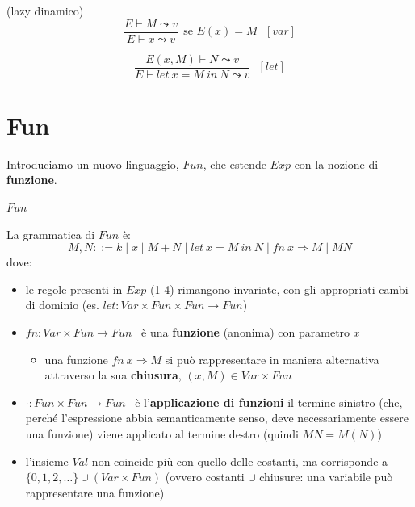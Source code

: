 \documentclass[a4paper,11pt]{report}
\begin{document}
\begin{gframe}[colframe=BlueGray, colback=BlueGrayLight, colbacktitle=BlueGray]{(lazy dinamico)}
    \vspace{-2em}
    \[ \frac{E\vdash M \leadsto v}{E\vdash x \leadsto v} \ \ \text{se } E(x)=M \ \ \ [var]\]

    \[ \frac{E(x, M)\vdash N \leadsto v}{E \vdash let \ x = M \ in \ N \leadsto v} \ \ \ [let] \]
\end{gframe}
\pagebreak

\section{Fun}
Introduciamo un nuovo linguaggio, \( Fun \), che estende \( Exp \) con la nozione di \textbf{funzione}.

\begin{defframe}{\( Fun \)}{}

La grammatica di \( Fun \) è:
    \[
        M, N ::= k \mid x \mid M + N \mid let \ x = M \ in \ N \mid fn \ x \Rightarrow M \mid MN
    \]
    dove:
    \begin{itemize}
        \item le regole presenti in \( Exp \) (1-4) rimangono invariate, con gli appropriati cambi di dominio (es. \( let : Var \times Fun \times Fun \to Fun \))
        \item \( fn : Var \times Fun \to Fun \) \ è una \textbf{funzione} (anonima) con parametro \( x \)     
        \begin{itemize}
            \item una funzione \( fn \ x \Rightarrow M \) si può rappresentare in maniera alternativa attraverso la sua \textbf{chiusura}, \( (x, M)\in Var \times Fun \)
        \end{itemize}
    \item \( \cdot : Fun \times Fun \to Fun \) \ è l'\textbf{applicazione di funzioni} 
        \subitem il termine sinistro (che, perché l'espressione abbia semanticamente senso, deve necessariamente essere una funzione) viene applicato al termine destro (quindi \( MN=M(N) \))
    \item l'insieme \( Val \) non coincide più con quello delle costanti, ma corrisponde a\\ \( \{0, 1, 2, \dots\} \cup (Var \times Fun) \) {\color{gray}\small(ovvero costanti \( \cup \) chiusure: una variabile può rappresentare una funzione)}
    \end{itemize}

\end{defframe}
\end{document}
